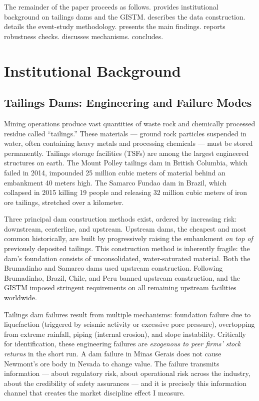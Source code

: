 \documentclass[12pt]{article}
\begin{document}
The remainder of the paper proceeds as follows.  provides institutional background on tailings dams and the GISTM.  describes the data construction.  details the event-study methodology.  presents the main findings.  reports robustness checks.  discusses mechanisms.  concludes.


\section{Institutional Background}\label{sec:background}

\subsection{Tailings Dams: Engineering and Failure Modes}

Mining operations produce vast quantities of waste rock and chemically processed residue called ``tailings.'' These materials --- ground rock particles suspended in water, often containing heavy metals and processing chemicals --- must be stored permanently. Tailings storage facilities (TSFs) are among the largest engineered structures on earth. The Mount Polley tailings dam in British Columbia, which failed in 2014, impounded 25 million cubic meters of material behind an embankment 40 meters high. The Samarco Fundao dam in Brazil, which collapsed in 2015 killing 19 people and releasing 32 million cubic meters of iron ore tailings, stretched over a kilometer.

Three principal dam construction methods exist, ordered by increasing risk: downstream, centerline, and upstream. Upstream dams, the cheapest and most common historically, are built by progressively raising the embankment \emph{on top of} previously deposited tailings. This construction method is inherently fragile: the dam's foundation consists of unconsolidated, water-saturated material. Both the Brumadinho and Samarco dams used upstream construction. Following Brumadinho, Brazil, Chile, and Peru banned upstream construction, and the GISTM imposed stringent requirements on all remaining upstream facilities worldwide.

Tailings dam failures result from multiple mechanisms: foundation failure due to liquefaction (triggered by seismic activity or excessive pore pressure), overtopping from extreme rainfall, piping (internal erosion), and slope instability. Critically for identification, these engineering failures are \emph{exogenous to peer firms' stock returns} in the short run. A dam failure in Minas Gerais does not cause Newmont's ore body in Nevada to change value. The failure transmits information --- about regulatory risk, about operational risk across the industry, about the credibility of safety assurances --- and it is precisely this information channel that creates the market discipline effect I measure.
\end{document}
